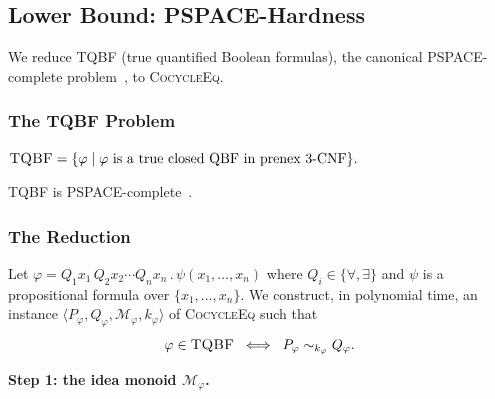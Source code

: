 \subsection{Lower Bound: PSPACE-Hardness}
\label{sec:pspace-lower}

We reduce TQBF (true quantified Boolean formulas), the canonical
PSPACE-complete problem~\cite{StockmeyerMeyer1973}, to
\textsc{CocycleEq}.

\subsubsection*{The TQBF Problem}

\begin{definition}[TQBF]
$\textsc{TQBF} = \{\varphi \mid \varphi \text{ is a true closed QBF
in prenex 3-CNF}\}.$
\end{definition}

\noindent
TQBF is \textsc{PSPACE}-complete~\cite{StockmeyerMeyer1973}.

\subsubsection*{The Reduction}

Let $\varphi = Q_1 x_1\, Q_2 x_2 \cdots Q_n x_n\,.\,\psi(x_1,\ldots,x_n)$
where $Q_i\in\{\forall,\exists\}$ and $\psi$ is a propositional
formula over $\{x_1,\ldots,x_n\}$.
We construct, in polynomial time, an instance
$\langle P_\varphi, Q_\varphi, \mathcal{M}_\varphi, k_\varphi\rangle$
of \textsc{CocycleEq} such that
\[
  \varphi \in \textsc{TQBF}
  \;\iff\;
  P_\varphi \sim_{k_\varphi} Q_\varphi.
\]

\medskip\noindent
\textbf{Step 1: the idea monoid $\mathcal{M}_\varphi$.}

